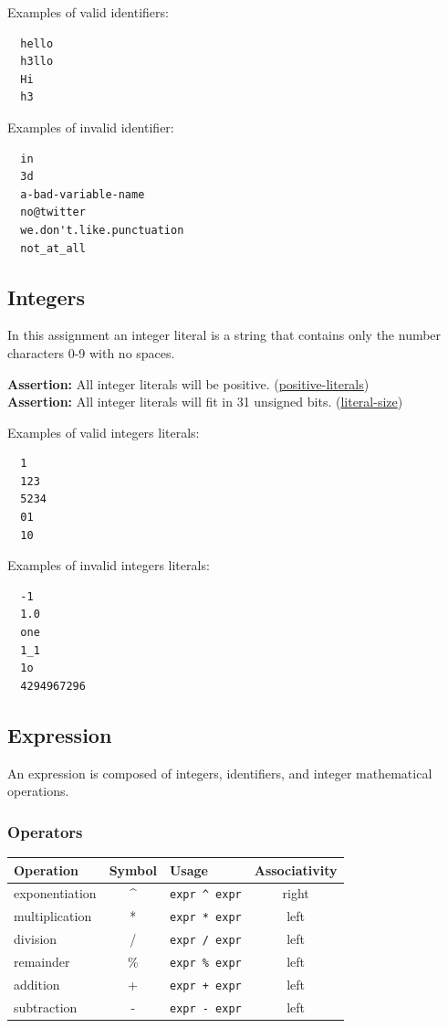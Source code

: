 \documentclass{article}
\newcommand{\code}[1]{\texttt{\textmd{#1}}}
\newcommand{\assertion}[2]{\textbf{Assertion: }#1 (\hyperlink{#2}{#2})}
\begin{document}
Examples of valid identifiers:
\begin{lstlisting}
  hello
  h3llo
  Hi
  h3
\end{lstlisting}

Examples of invalid identifier:
\begin{lstlisting}
  in
  3d
  a-bad-variable-name
  no@twitter
  we.don't.like.punctuation
  not_at_all
\end{lstlisting}

\subsection{Integers}
In this assignment an integer literal is a string that contains only the number
characters 0-9 with no spaces.

\assertion{All integer literals will be positive.}{positive-literals}\\
\assertion{All integer literals will fit in 31 unsigned bits.}{literal-size}

Examples of valid integers literals:
\begin{lstlisting}
  1
  123
  5234
  01
  10
\end{lstlisting}

Examples of invalid integers literals:
\begin{lstlisting}
  -1
  1.0
  one
  1_1
  1o
  4294967296
\end{lstlisting}

\subsection{Expression}
An expression is composed of integers, identifiers, and integer mathematical operations.

\subsubsection{Operators}
\begin{center}
  \begin{tabular}{|l|c|l|c|}
    \hline
    \textbf{Operation} & \textbf{Symbol} & \textbf{Usage} &
    \textbf{Associativity} \\
    \hline
    exponentiation & \textasciicircum & \code{expr \textasciicircum\ expr} & right\\
    multiplication & *  & \code{expr * expr}  & left \\
    division       & /  & \code{expr / expr}  & left \\
    remainder      & \% & \code{expr \% expr}  & left \\
    addition       & +  & \code{expr + expr}  & left \\
    subtraction    & -  & \code{expr - expr}  & left \\
    \hline
  \end{tabular}
\end{center}
\end{document}
